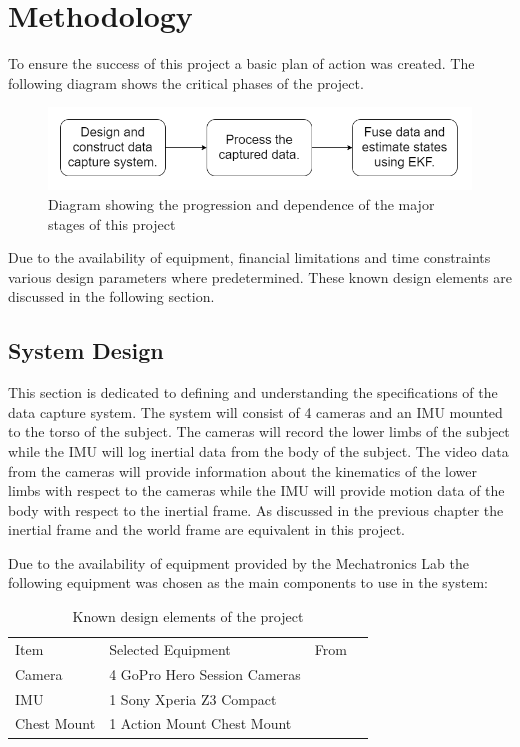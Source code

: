 \chapter{Methodology}
To ensure the success of this project a basic plan of action was created. The following diagram shows the critical phases of the project.

\begin{figure}[!ht] 
\captionsetup{width=0.8\linewidth, font=small}  
\includegraphics[width=0.8\linewidth]{figures/planOfAction.png}
  \caption{Diagram showing the progression and dependence of the major stages of this project}
\label{fig:planOfAction}
\end{figure}

Due to the availability of equipment, financial limitations and time constraints various design parameters where predetermined. These known design elements are discussed in the following section.
  
\section{System Design}
This section is dedicated to defining and understanding the specifications of the data capture system. The system will consist of 4 cameras and an IMU mounted to the torso of the subject. The cameras will record the lower limbs of the subject while the IMU will log inertial data from the body of the subject. The video data from the cameras will provide information about the kinematics of the lower limbs with respect to the cameras while the IMU will provide motion data of the body with respect to the inertial frame. As discussed in the previous chapter the inertial frame and the world frame are equivalent in this project. 

Due to the availability of equipment provided by the Mechatronics Lab the following equipment was chosen as the main components to use in the system:


\begin{table}[!ht]
\label{equipment-table}
\begin{tabular}{llll}
Item		 & Selected Equipment				& From		  			\\
Camera      & 4 GoPro Hero Session Cameras  & \cite{gopro} 		\\
IMU         & 1 Sony Xperia Z3 Compact      & \cite{sony}  		\\
Chest Mount & 1 Action Mount Chest Mount    & \cite{actionmounts}   
\end{tabular}
\caption{Known design elements of the project}
\end{table}

